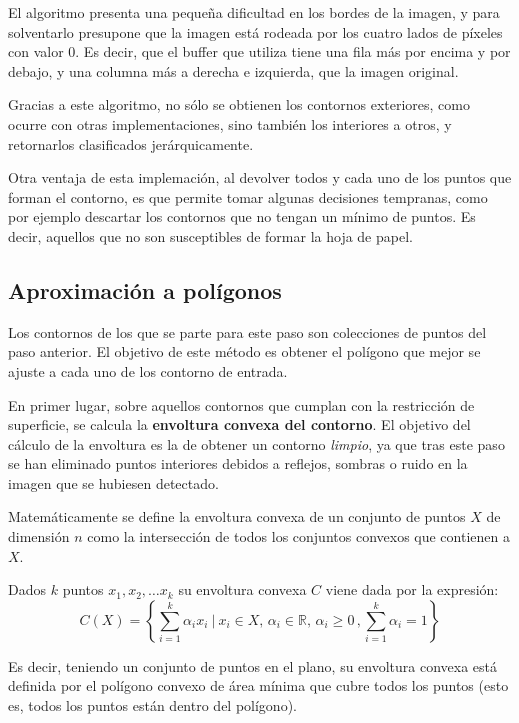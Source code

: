 El algoritmo presenta una pequeña dificultad en los bordes de la imagen, y para solventarlo presupone que la imagen está rodeada por los cuatro lados de píxeles con valor 0. Es decir, que el buffer que utiliza tiene una fila más por encima y por debajo, y una columna más a derecha e izquierda, que la imagen original.

Gracias a este algoritmo, no sólo se obtienen los contornos exteriores, como ocurre con otras implementaciones, sino también los interiores a otros, y retornarlos clasificados jerárquicamente. 

Otra ventaja de esta implemación, al devolver todos y cada uno de los puntos que forman el contorno, es que permite tomar algunas decisiones tempranas, como por ejemplo descartar los contornos que no tengan un mínimo de puntos. Es decir, aquellos que no son susceptibles de formar la hoja de papel. 

\subsection{Aproximación a polígonos}
Los contornos de los que se parte para este paso son colecciones de puntos del paso anterior. El objetivo de este método es obtener el polígono que mejor se ajuste a cada uno de los contorno de entrada.
 
En primer lugar, sobre aquellos contornos que cumplan con la restricción de superficie, se calcula la \textbf{envoltura convexa del contorno}. El objetivo del cálculo de la envoltura es la de obtener un contorno \emph{limpio}, ya que tras este paso se han eliminado puntos interiores debidos a reflejos, sombras o ruido en la imagen que se hubiesen detectado.

Matemáticamente se define la envoltura convexa de un conjunto de puntos $X$ de dimensión $n$ como la intersección de todos los conjuntos convexos que contienen a $X$. 

Dados $k$ puntos $x_1, x_2,\dots x_k$ su envoltura convexa $C$ viene dada por la expresión:
\begin{equation}
C(X) =\left\{\sum_{i=1}^k \alpha_i x_i \ \Bigg | \ x_i\in X, \, \alpha_i\in \mathbb{R}, \, \alpha_i \geq 0 \, , \sum_{i=1}^k \alpha_i=1\right\}
\end{equation}

Es decir, teniendo un conjunto de puntos en el plano, su envoltura convexa está definida por el polígono convexo de área mínima que cubre todos los puntos (esto es, todos los puntos están dentro del polígono). 

